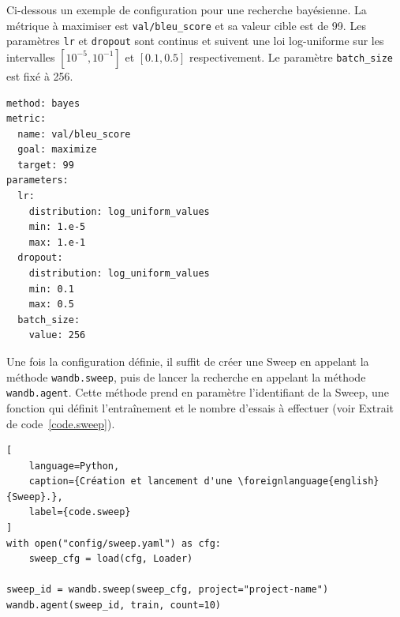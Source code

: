Ci-dessous un exemple de configuration pour une recherche bayésienne.
La métrique à maximiser est \verb|val/bleu_score| et sa valeur cible est de 99.
Les paramètres \verb|lr| et \verb|dropout| sont continus et suivent une loi log-uniforme
sur les intervalles \([10^{-5}, 10^{-1}]\) et \([0.1, 0.5]\) respectivement.
Le paramètre \verb|batch_size| est fixé à 256.

\begin{verbatim}
method: bayes
metric:
  name: val/bleu_score
  goal: maximize
  target: 99
parameters:
  lr:
    distribution: log_uniform_values
    min: 1.e-5
    max: 1.e-1
  dropout:
    distribution: log_uniform_values
    min: 0.1
    max: 0.5
  batch_size:
    value: 256
\end{verbatim}

Une fois la configuration définie, 
il suffit de créer une \foreignlanguage{english}{Sweep} en appelant la méthode \verb|wandb.sweep|,
puis de lancer la recherche en appelant la méthode \verb|wandb.agent|.
Cette méthode prend en paramètre l'identifiant de la \foreignlanguage{english}{Sweep}, 
une fonction qui définit l'entraînement et le nombre d'essais à effectuer (voir Extrait de code~\ref{code.sweep}).

\begin{lstlisting}[
    language=Python,
    caption={Création et lancement d'une \foreignlanguage{english}{Sweep}.},
    label={code.sweep}
]
with open("config/sweep.yaml") as cfg:
    sweep_cfg = load(cfg, Loader)

sweep_id = wandb.sweep(sweep_cfg, project="project-name")
wandb.agent(sweep_id, train, count=10)
\end{lstlisting}



